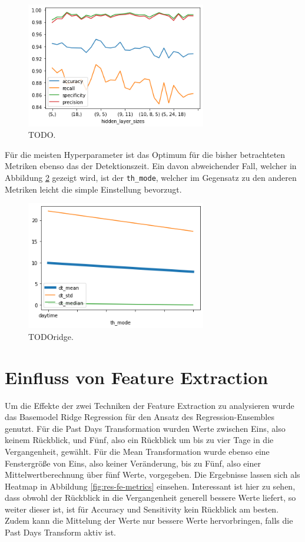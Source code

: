 \begin{figure}
    \centering
    \includegraphics[width=0.7\textwidth]{res/res-mlp-layers}
    \caption{TODO.}
    \label{fig:res-mlp-layers}
\end{figure}


Für die meisten Hyperparameter ist das Optimum für die bisher betrachteten Metriken ebenso das der
 Detektionszeit. Ein davon abweichender Fall, welcher in Abbildung \ref{fig:res-fe-th-mode} gezeigt wird, ist der
 \texttt{th\_mode}, welcher im Gegensatz zu den anderen Metriken leicht die simple Einstellung bevorzugt.

\begin{figure}
    \centering
    \includegraphics[width=0.7\textwidth]{res/res-fe-th-mode}
    \caption{TODOridge.}
    \label{fig:res-fe-th-mode}
\end{figure}

\section{Einfluss von Feature Extraction}

Um die Effekte der zwei Techniken der Feature Extraction zu analysieren wurde das Basemodel Ridge Regression
 für den Ansatz des Regression-Ensembles genutzt. Für die Past Days Transformation wurden Werte zwischen Eins,
 also keinem Rückblick, und Fünf, also ein Rückblick um bis zu vier Tage in die Vergangenheit, gewählt. Für
 die Mean Transformation wurde ebenso eine Fenstergröße von Eins, also keiner Veränderung, bis zu Fünf, also
 einer Mittelwertberechnung über fünf Werte, vorgegeben. Die Ergebnisse lassen sich als Heatmap in
 Abbildung \ref{fig:res-fe-metrics} einsehen. Interessant ist hier zu sehen, dass obwohl der Rückblick in die Vergangenheit generell
 bessere Werte liefert, so weiter dieser ist, ist für Accuracy und Sensitivity kein Rückblick am besten. Zudem
 kann die Mittelung der Werte nur bessere Werte hervorbringen, falls die Past Days Transform aktiv ist.

